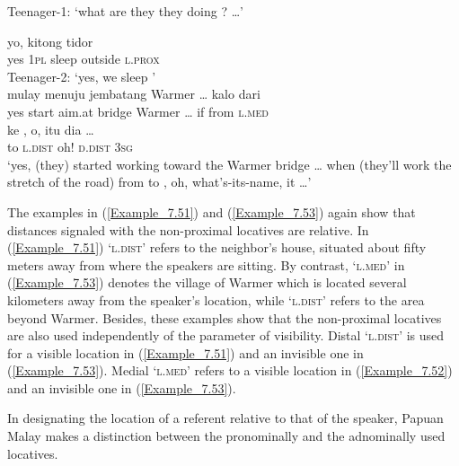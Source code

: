 {\glt Teenager-1: ‘what are they they doing ? \ldots’

\vspace{10pt}
\ex
\label{Example_7.52b}
   {yo,}  kitong  tidor    \\
  { }    {yes}  \textsc{1pl}  sleep  outside  \textsc{l.prox}\\
\glt Teenager-2: ‘yes, we sleep ’ \textstyleExampleSource{[080921-009-Cv.0001/0013]}\\
\z
\z
\ea
\label{Example_7.53}
 {{mulay}} {{menuju}} {{jembatang}} {Warmer} {\ldots} {kalo} {dari} {}\\ %
 {yes}  {start}  {aim.at}  {bridge}  Warmer {\ldots}   if  from  \textsc{l.med}\\
\gll ke  {,}  {o},  {itu}  dia  {\ldots}\\
 to  {\textsc{l.dist}}  {oh!}  {\textsc{d.dist}}  \textsc{3sg}  {}\\
\glt 
‘yes, (they) started working toward the Warmer bridge {\ldots} when (they’ll work the stretch of the road) from  to , oh, what’s-its-name, it \ldots’ \textstyleExampleSource{[081006-033-Cv.0013/0015/0017]}
\z



The examples in (\ref{Example_7.51}) and (\ref{Example_7.53}) again show that distances signaled with the non-prox\-i\-mal locatives are relative. In (\ref{Example_7.51})  ‘\textsc{l.dist}’ refers to the neighbor’s house, situated about fifty meters away from where the speakers are sitting. By contrast,  ‘\textsc{l.med}’ in (\ref{Example_7.53}) denotes the village of Warmer which is located several kilometers away from the speaker’s location, while  ‘\textsc{l.dist}’ refers to the area beyond Warmer. Besides, these examples show that the non-proximal locatives are also used independently of the parameter of visibility. Distal  ‘\textsc{l.dist}’ is used for a visible location in (\ref{Example_7.51}) and an invisible one in (\ref{Example_7.53}). Medial  ‘\textsc{l.med}’ refers to a visible location in (\ref{Example_7.52}) and an invisible one in (\ref{Example_7.53}).



In designating the location of a referent relative to that of the speaker, Papuan Malay makes a distinction between the pronominally and the adnominally used locatives.



}
